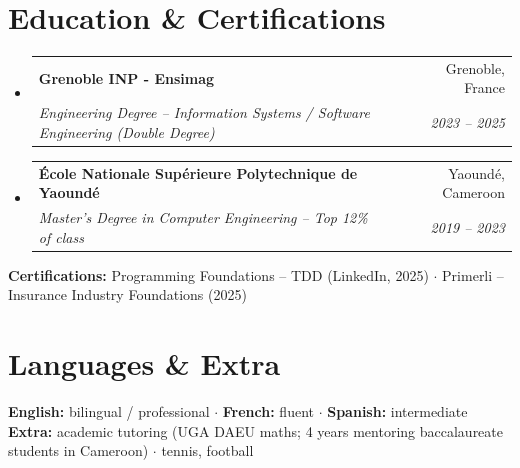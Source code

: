 \documentclass[letterpaper,10.5pt]{article}
\makeatletter
\newcommand{\resumeSubheading}[4]{
  \vspace{-1pt}\item
    \begin{tabular*}{0.97\textwidth}[t]{l@{\extracolsep{\fill}}r}
      \textbf{#1} & #2 \\
      \textit{\small#3} & \textit{\small #4} \\
    \end{tabular*}\vspace{-5pt}
}
\newcommand{\resumeSubHeadingListStart}{\begin{itemize}[leftmargin=0.15in, label={}]}
\newcommand{\resumeSubHeadingListEnd}{\end{itemize}}
\makeatother
\begin{document}
\section{Education \& Certifications}

\resumeSubHeadingListStart
  \resumeSubheading
    {Grenoble INP - Ensimag}{Grenoble, France}
    {Engineering Degree -- Information Systems / Software Engineering (Double Degree)}{2023 -- 2025}
  \resumeSubheading
    {\'Ecole Nationale Sup\'erieure Polytechnique de Yaound\'e}{Yaound\'e, Cameroon}
    {Master's Degree in Computer Engineering -- Top 12\% of class}{2019 -- 2023}
\resumeSubHeadingListEnd
\small{
\textbf{Certifications:} Programming Foundations -- TDD (LinkedIn, 2025) $\cdot$ Primerli -- Insurance Industry Foundations (2025)
}

\section{Languages \& Extra}
\small{
\textbf{English:} bilingual / professional $\cdot$ \textbf{French:} fluent $\cdot$ \textbf{Spanish:} intermediate \\
\textbf{Extra:} academic tutoring (UGA DAEU maths; 4 years mentoring baccalaureate students in Cameroon) $\cdot$ tennis, football
}
\end{document}
